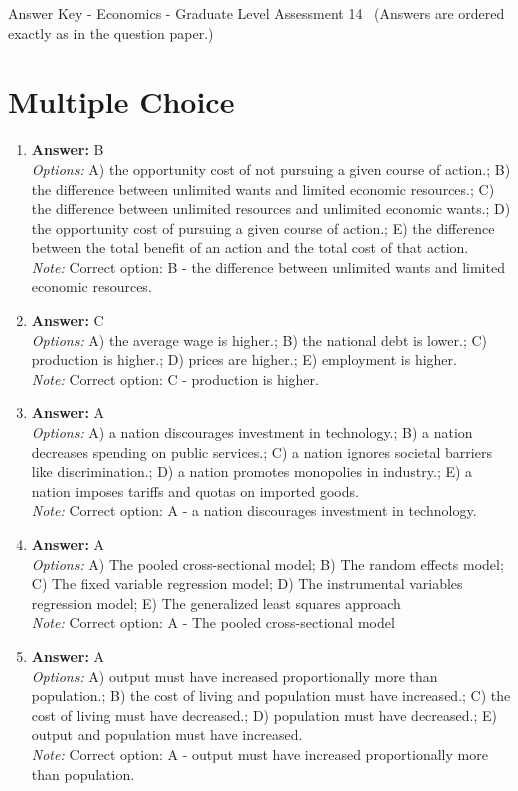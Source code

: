 \documentclass[12pt]{article}
\begin{document}
\begin{center}
Answer Key - Economics - Graduate Level Assessment 14 \
\small (Answers are ordered exactly as in the question paper.)
\end{center}

\section*{Multiple Choice}
\begin{enumerate}[label=\arabic*.]
\item \textbf{Answer:} B
\\ \textit{Options:} A) the opportunity cost of not pursuing a given course of action.; B) the difference between unlimited wants and limited economic resources.; C) the difference between unlimited resources and unlimited economic wants.; D) the opportunity cost of pursuing a given course of action.; E) the difference between the total benefit of an action and the total cost of that action.
\\ \textit{Note:} Correct option: B - the difference between unlimited wants and limited economic resources.
\item \textbf{Answer:} C
\\ \textit{Options:} A) the average wage is higher.; B) the national debt is lower.; C) production is higher.; D) prices are higher.; E) employment is higher.
\\ \textit{Note:} Correct option: C - production is higher.
\item \textbf{Answer:} A
\\ \textit{Options:} A) a nation discourages investment in technology.; B) a nation decreases spending on public services.; C) a nation ignores societal barriers like discrimination.; D) a nation promotes monopolies in industry.; E) a nation imposes tariffs and quotas on imported goods.
\\ \textit{Note:} Correct option: A - a nation discourages investment in technology.
\item \textbf{Answer:} A
\\ \textit{Options:} A) The pooled cross-sectional model; B) The random effects model; C) The fixed variable regression model; D) The instrumental variables regression model; E) The generalized least squares approach
\\ \textit{Note:} Correct option: A - The pooled cross-sectional model
\item \textbf{Answer:} A
\\ \textit{Options:} A) output must have increased proportionally more than population.; B) the cost of living and population must have increased.; C) the cost of living must have decreased.; D) population must have decreased.; E) output and population must have increased.
\\ \textit{Note:} Correct option: A - output must have increased proportionally more than population.
\end{enumerate}
\end{document}
